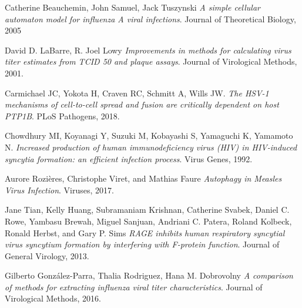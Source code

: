 \documentclass[a4paper]{article}
\begin{document}
\begin{thebibliography}{9}
Catherine Beauchemin, John Samuel, Jack Tuszynski
\textit{A simple cellular automaton model for influenza A viral infections}.
Journal of Theoretical Biology, 2005

David D. LaBarre, R. Joel Lowy
\textit{Improvements in methods for calculating virus titer estimates from TCID 50 and plaque assays}.
Journal of Virological Methods, 2001.

Carmichael JC, Yokota H, Craven RC, Schmitt A, Wills JW.
\textit{The HSV-1 mechanisms of cell-to-cell spread and fusion are critically dependent on host PTP1B}.
PLoS Pathogens, 2018.

Chowdhury MI, Koyanagi Y, Suzuki M, Kobayashi S, Yamaguchi K, Yamamoto N.
\textit{Increased production of human immunodeficiency virus (HIV) in HIV-induced syncytia formation: an efficient infection process}.
Virus Genes, 1992.

Aurore Rozières, Christophe Viret, and Mathias Faure
\textit{Autophagy in Measles Virus Infection}.
Viruses, 2017.

Jane Tian, Kelly Huang, Subramaniam Krishnan, Catherine Svabek, Daniel C. Rowe, Yambasu Brewah, Miguel Sanjuan, Andriani C. Patera, Roland Kolbeck, Ronald Herbst, and Gary P. Sims
\textit{RAGE inhibits human respiratory syncytial virus syncytium formation by interfering with F-protein function}.
Journal of General Virology, 2013.

Gilberto González-Parra, Thalia Rodriguez, Hana M. Dobrovolny
\textit{A comparison of methods for extracting influenza viral titer
characteristics}.
Journal of Virological Methods, 2016.

\end{thebibliography}
\end{document}
